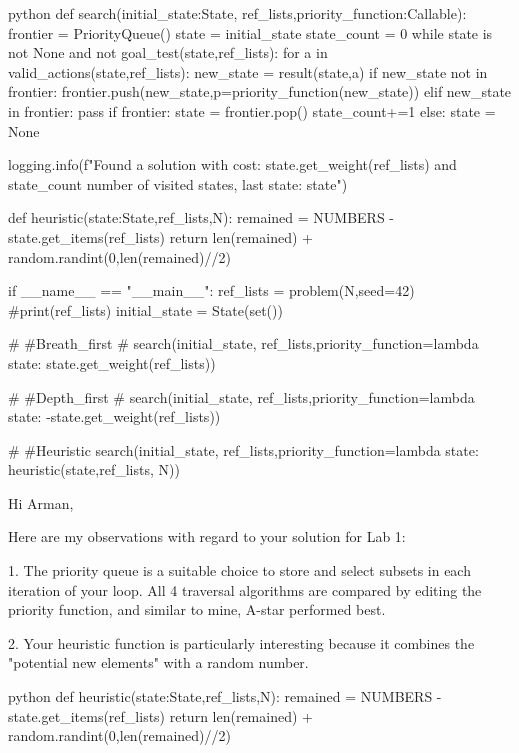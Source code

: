 \begin{mintedbox}{python}
    def search(initial_state:State, ref_lists,priority_function:Callable):
        frontier = PriorityQueue()
        state = initial_state
        state_count = 0
        while state is not None and not goal_test(state,ref_lists):
            for a in valid_actions(state,ref_lists):
                new_state = result(state,a)
                if new_state not in frontier:
                    frontier.push(new_state,p=priority_function(new_state))
                elif new_state in frontier:
                    pass
            if frontier:
                state = frontier.pop()
                state_count+=1
            else:
                state = None

        logging.info(f"Found a solution with cost: {state.get_weight(ref_lists)} and {state_count} number of visited states, last state: {state}")

    def heuristic(state:State,ref_lists,N):
        remained = NUMBERS - state.get_items(ref_lists)
        return len(remained) + random.randint(0,len(remained)//2)


    if __name__ == "__main__":
        ref_lists = problem(N,seed=42)
        #print(ref_lists)
        initial_state = State(set())

        # #Breath_first
        # search(initial_state, ref_lists,priority_function=lambda state: state.get_weight(ref_lists))

        # #Depth_first
        # search(initial_state, ref_lists,priority_function=lambda state: -state.get_weight(ref_lists))

        # #Heuristic
        search(initial_state, ref_lists,priority_function=lambda state: heuristic(state,ref_lists, N))
\end{mintedbox}

Hi Arman,

Here are my observations with regard to your solution for Lab 1:

1. The priority queue is a suitable choice to store and select subsets in each iteration of your loop. All 4 traversal algorithms are compared by editing the priority function, and similar to mine, A-star performed best.

2. Your heuristic function is particularly interesting because it combines the "potential new elements" with a random number.

\begin{mintedbox}{python}
def heuristic(state:State,ref_lists,N):
    remained = NUMBERS - state.get_items(ref_lists)
    return len(remained) + random.randint(0,len(remained)//2)
\end{mintedbox}


